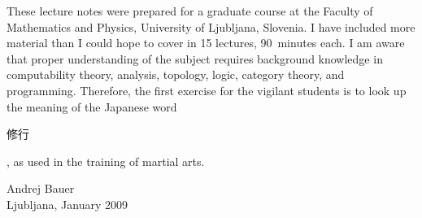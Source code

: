 \documentclass[11pt,a4paper,twoside]{book}
\newcommand{\clearemptydoublepage}{\newpage{\pagestyle{empty}\cleardoublepage}}
\begin{document}
These lecture notes were prepared for a graduate course at the Faculty of Mathematics and
Physics, University of Ljubljana, Slovenia. I have included more material than I could
hope to cover in 15 lectures, 90~minutes each. I am aware that proper understanding of the
subject requires background knowledge in computability theory, analysis, topology, logic,
category theory, and programming. Therefore, the first exercise for the vigilant students
is to look up the meaning of the Japanese word \begin{CJK}{UTF8}{min}修行\end{CJK}, as
used in the training of martial arts.


\bigskip

\begin{flushright}
Andrej Bauer\\
Ljubljana, January 2009
\end{flushright}



\clearemptydoublepage

{
\renewcommand{\markboth}[2]{}
\tableofcontents
}







\clearemptydoublepage



{
\renewcommand{\markboth}[2]{}

}




\end{document}
